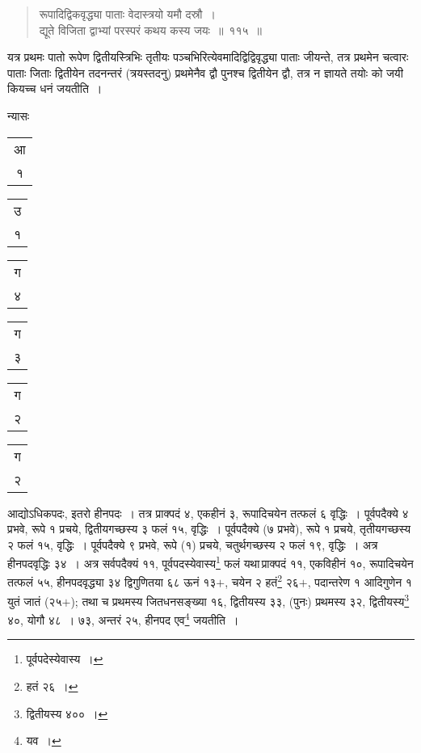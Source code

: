 \documentclass[10pt, openany]{book}
\begin{document}
{{{{{{{{{{{{{{\begin{quote}
 {\eg रूपादिद्विकवृद्ध्या पाताः वेदास्त्रयो यमौ दस्रौ~। \\
 द्यूते विजिता द्वाभ्यां परस्परं कथय कस्य जयः~॥~११५~॥}\end{quote}

{यत्र प्रथमः पातो रूपेण द्वितीयस्त्रिभिः तृतीयः पञ्चभिरित्येवमादिद्विद्विवृद्ध्या पाताः}
{जीयन्ते, तत्र प्रथमेन चत्वारः पाताः जिताः द्वितीयेन तदनन्तरं
(त्रयस्तदनु) प्रथमेनैव द्वौ}
{पुनश्च द्वितीयेन द्वौ, तत्र न ज्ञायते तयोः को जयी कियच्च धनं जयतीति~।}
\vspace{3mm}

{न्यासः\textendash }
\vspace{-2mm}

\begin{center}
\begin{tabular}{c}आ \\१\end{tabular}
\begin{tabular}{c}उ\\१\end{tabular}
\begin{tabular}{c}ग\\४\end{tabular}
\begin{tabular}{c}ग\\ ३\end{tabular}
\begin{tabular}{c}ग\\२\end{tabular}
\begin{tabular}{c}ग\\२\end{tabular}
\end{center}
\vspace{-1mm}

{आद्योऽधिकपदः, इतरो हीनपदः~। तत्र प्राक्पदं ४, एकहीनं ३, रूपादिचयेन
तत्फलं ६}
{वृद्धिः~। पूर्वपदैक्ये ४ प्रभवे, रूपे १ प्रचये, द्वितीयगच्छस्य ३ फलं १५,
वृद्धिः~। पूर्वपदैक्ये}
{(७ प्रभवे), रूपे १ प्रचये, तृतीयगच्छस्य २ फलं १५, वृद्धिः~। पूर्वपदैक्ये
९ प्रभवे, रूपे}
{(१) प्रचये, चतुर्थगच्छस्य २ फलं १९, वृद्धिः~। अत्र हीनपदवृद्धिः ३४~। अत्र
सर्वपदैक्यं ११,}
{पूर्वपदस्येवास्य\renewcommand{\thefootnote}{१}\footnote{पूर्वपदेस्येवास्य~।} फलं यथा\textendash \,प्राक्पदं ११, एकविहीनं १०,
रूपादिचयेन तत्फलं ५५, हीनपदवृद्ध्या ३४ द्विगुणितया ६८ ऊनं १३$+$, चयेन २ हतं\renewcommand{\thefootnote}{२}\footnote{हतं २६~।} २६$+$, पदान्तरेण १
आदिगुणेन १ युतं}
{जातं (२५$+$); तथा च प्रथमस्य जितधनसङ्ख्या १६, द्वितीयस्य ३३, (पुनः)
प्रथमस्य ३२,}
{द्वितीयस्य\renewcommand{\thefootnote}{३}\footnote{द्वितीयस्य ४००~।} ४०, योगौ ४८~। ७३, अन्तरं २५, हीनपद एव\renewcommand{\thefootnote}{४}\footnote{यव~।} जयतीति~।}
\vspace{3mm}

}}}}}}}}}}}}}}
\end{document}

